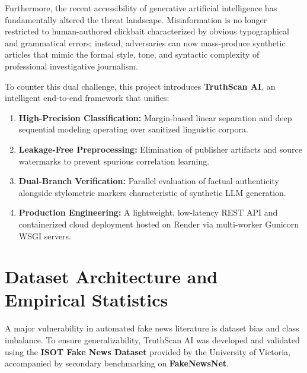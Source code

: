 \documentclass[11pt,a4paper]{article}
\begin{document}
Furthermore, the recent accessibility of generative artificial intelligence has fundamentally altered the threat landscape. Misinformation is no longer restricted to human-authored clickbait characterized by obvious typographical and grammatical errors; instead, adversaries can now mass-produce synthetic articles that mimic the formal style, tone, and syntactic complexity of professional investigative journalism.

To counter this dual challenge, this project introduces \textbf{TruthScan AI}, an intelligent end-to-end framework that unifies:
\begin{enumerate}[leftmargin=*]
    \item \textbf{High-Precision Classification:} Margin-based linear separation and deep sequential modeling operating over sanitized linguistic corpora.
    \item \textbf{Leakage-Free Preprocessing:} Elimination of publisher artifacts and source watermarks to prevent spurious correlation learning.
    \item \textbf{Dual-Branch Verification:} Parallel evaluation of factual authenticity alongside stylometric markers characteristic of synthetic LLM generation.
    \item \textbf{Production Engineering:} A lightweight, low-latency REST API and containerized cloud deployment hosted on Render via multi-worker Gunicorn WSGI servers.
\end{enumerate}

\section{Dataset Architecture and Empirical Statistics}
A major vulnerability in automated fake news literature is dataset bias and class imbalance. To ensure generalizability, TruthScan AI was developed and validated using the \textbf{ISOT Fake News Dataset} provided by the University of Victoria, accompanied by secondary benchmarking on \textbf{FakeNewsNet}.
\end{document}

